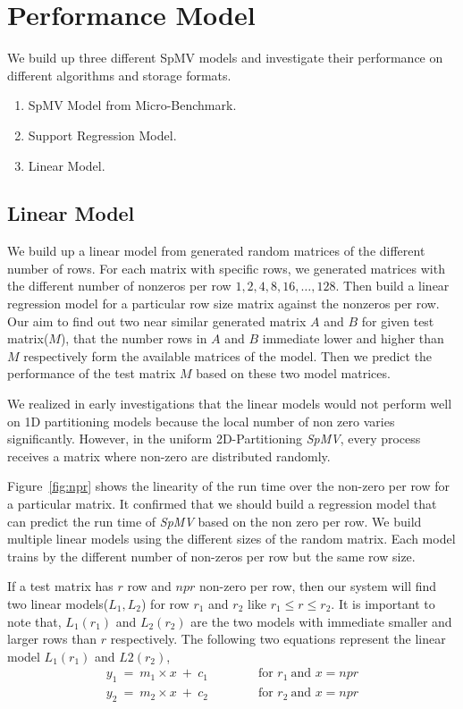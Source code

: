 \documentclass[sigconf,review,anonymous]{acmart}
\begin{document}
\section{Performance Model}
We build up three different SpMV models and investigate their performance on different algorithms and
storage formats.
\begin{enumerate}
\item SpMV Model from Micro-Benchmark.
\item Support Regression Model.
\item Linear Model.
\end{enumerate} 

\subsection{Linear Model}
\label{sec:linear-2d-spmv}
We build up a linear model from generated random matrices of the different
number of rows. For each matrix with specific rows, we generated
matrices with the different number of nonzeros per row $1, 2, 4, 8, 16,
\dots, 128$. Then build a linear regression model for a particular row
size matrix against the nonzeros per row. Our aim to find out two near
similar generated matrix $A$ and $B$ for given test matrix($M$), that
the number rows in $A$ and $B$ immediate lower and higher than $M$
respectively form the available matrices of the model. Then we predict
the performance of the test matrix $M$ based on these two model
matrices.

We realized in early investigations that the linear models would not
perform well on 1D partitioning models because the local number of non
zero varies significantly. However, in the uniform 2D-Partitioning
\textit{SpMV}, every process receives a matrix where non-zero are
distributed randomly.

Figure~\ref{fig:npr} shows the linearity of the run time over the
non-zero per row for a particular matrix. It confirmed that we should
build a regression model that can predict the run time of
\textit{SpMV} based on the non zero per row. We build multiple linear
models using the different sizes of the random matrix. Each model
trains by the different number of non-zeros per row but the same row
size.

If a test matrix has $r$ row and $npr$ non-zero per row, then our
system will find two linear models($L_1, L_2$) for row $r_1$ and $r_2$
like $r_1\leq r\leq r_2$.  It is important to note that, $L_1(r_1)$
and $L_2(r_2)$ are the two models with immediate smaller and larger rows
than $r$ respectively.  The following two equations represent the
linear model $L_1(r_1)$ and $L2(r_2)$,
\begin{equation*}
\begin{array}{l}
y_1\ =\ m_1\times x\ +\ c_1  \qquad\qquad\text{for } r_1 \ \text{and } x=npr\\
y_2\ =\ m_2\times x\ +\ c_2  \qquad\qquad\text{for } r_2 \ \text{and } x=npr
\end{array}
\end{equation*}
\end{document}
